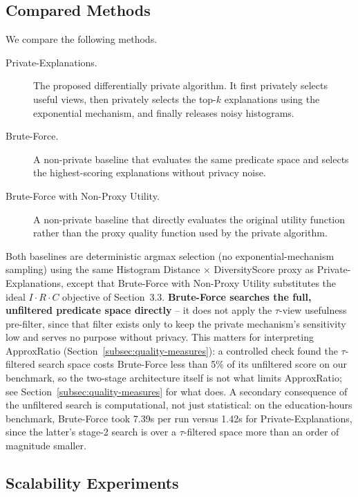 \subsection{Compared Methods}
\label{subsec:compared-methods}

We compare the following methods.

\begin{description}
    \item[Private-Explanations.]
    The proposed differentially private algorithm. It first privately selects
    useful views, then privately selects the top-$k$ explanations using the
    exponential mechanism, and finally releases noisy histograms.

    \item[Brute-Force.]
    A non-private baseline that evaluates the same predicate space and selects
    the highest-scoring explanations without privacy noise.

    \item[Brute-Force with Non-Proxy Utility.]
    A non-private baseline that directly evaluates the original utility function
    rather than the proxy quality function used by the private algorithm.
\end{description}

Both baselines are deterministic argmax selection (no exponential-mechanism
sampling) using the same Histogram Distance $\times$ DiversityScore proxy
as Private-Explanations, except that Brute-Force with Non-Proxy Utility
substitutes the ideal $I \cdot R \cdot C$ objective of Section~3.3.
\textbf{Brute-Force searches the full, unfiltered predicate space
directly} -- it does not apply the $\tau$-view usefulness pre-filter, since
that filter exists only to keep the private mechanism's sensitivity low
and serves no purpose without privacy. This matters for interpreting
ApproxRatio (Section~\ref{subsec:quality-measures}): a controlled check
found the $\tau$-filtered search space costs Brute-Force less than 5\% of
its unfiltered score on our benchmark, so the two-stage architecture
itself is not what limits ApproxRatio; see
Section~\ref{subsec:quality-measures} for what does. A secondary
consequence of the unfiltered search is computational, not just
statistical: on the education-hours benchmark, Brute-Force took 7.39s
per run versus 1.42s for Private-Explanations, since the latter's
stage-2 search is over a $\tau$-filtered space more than an order of
magnitude smaller.

\subsection{Scalability Experiments}
\label{subsec:scalability}

